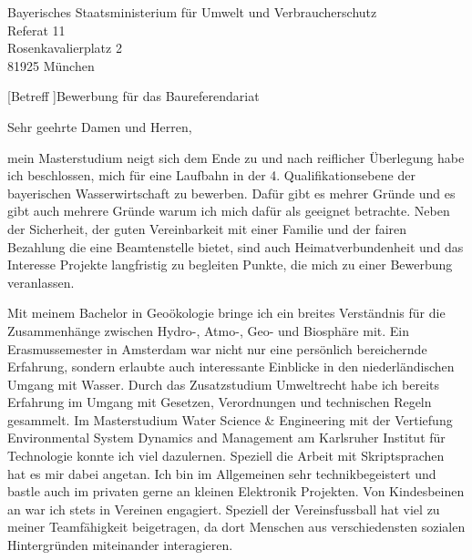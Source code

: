 
\emergencystretch=20pt%


\begin{letter}{%
Bayerisches Staatsministerium für Umwelt und Verbraucherschutz\\
Referat 11\\
Rosenkavalierplatz 2\\
81925 München%
}


[Betreff ]{Bewerbung für das Baureferendariat}
\opening{Sehr geehrte Damen und Herren,}

mein Masterstudium neigt sich dem Ende zu und nach reiflicher Überlegung habe ich beschlossen, mich für eine Laufbahn in der 4. Qualifikationsebene der bayerischen Wasserwirtschaft zu bewerben. Dafür gibt es mehrer Gründe und es gibt auch mehrere Gründe warum ich mich dafür als geeignet betrachte. Neben der Sicherheit, der guten Vereinbarkeit mit einer Familie und der fairen Bezahlung die eine Beamtenstelle bietet, sind auch Heimatverbundenheit und das Interesse Projekte langfristig zu begleiten Punkte, die mich zu einer Bewerbung veranlassen. 

Mit meinem Bachelor in Geoökologie bringe ich ein breites Verständnis für die Zusammenhänge zwischen Hydro-, Atmo-, Geo- und Biosphäre mit.  Ein Erasmussemester in Amsterdam war nicht nur eine persönlich bereichernde Erfahrung, sondern erlaubte auch interessante Einblicke in den niederländischen Umgang mit Wasser. Durch das Zusatzstudium Umweltrecht habe ich bereits Erfahrung im Umgang mit Gesetzen, Verordnungen und technischen Regeln gesammelt. Im Masterstudium Water Science & Engineering mit der Vertiefung Environmental System Dynamics and Management am Karlsruher Institut für Technologie konnte ich viel dazulernen. Speziell die Arbeit mit Skriptsprachen hat es mir dabei angetan. Ich bin im Allgemeinen sehr technikbegeistert und bastle auch im privaten gerne an kleinen Elektronik Projekten. Von Kindesbeinen an war ich stets in Vereinen engagiert. Speziell der Vereinsfussball hat viel zu meiner Teamfähigkeit beigetragen, da dort Menschen aus verschiedensten sozialen Hintergründen miteinander interagieren. 


\end{letter}
